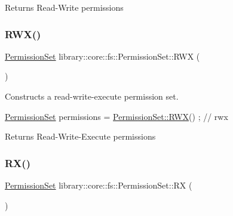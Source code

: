 \begin{DoxyReturn}{Returns}
Read-\/\+Write permissions 
\end{DoxyReturn}
\mbox{\label{classlibrary_1_1core_1_1fs_1_1_permission_set_aa193bcbecb0c6ebbb488e99052cbba88}} 
\subsubsection{\texorpdfstring{R\+W\+X()}{RWX()}}
{\footnotesize\ttfamily \hyperlink{classlibrary_1_1core_1_1fs_1_1_permission_set}{Permission\+Set} library\+::core\+::fs\+::\+Permission\+Set\+::\+R\+WX (\begin{DoxyParamCaption}{ }\end{DoxyParamCaption})\hspace{0.3cm}{\ttfamily [static]}}



Constructs a read-\/write-\/execute permission set. 


\begin{DoxyCode}
\hyperlink{classlibrary_1_1core_1_1fs_1_1_permission_set_a8a6eb39cc2a8bca92a657d065d3e36ba}{PermissionSet} permissions = \hyperlink{classlibrary_1_1core_1_1fs_1_1_permission_set_aa193bcbecb0c6ebbb488e99052cbba88}{PermissionSet::RWX}() ; \textcolor{comment}{// rwx}
\end{DoxyCode}


\begin{DoxyReturn}{Returns}
Read-\/\+Write-\/\+Execute permissions 
\end{DoxyReturn}
\mbox{\label{classlibrary_1_1core_1_1fs_1_1_permission_set_adb5417e6188ca697a21723613a60b690}} 
\subsubsection{\texorpdfstring{R\+X()}{RX()}}
{\footnotesize\ttfamily \hyperlink{classlibrary_1_1core_1_1fs_1_1_permission_set}{Permission\+Set} library\+::core\+::fs\+::\+Permission\+Set\+::\+RX (\begin{DoxyParamCaption}{ }\end{DoxyParamCaption})\hspace{0.3cm}{\ttfamily [static]}}



